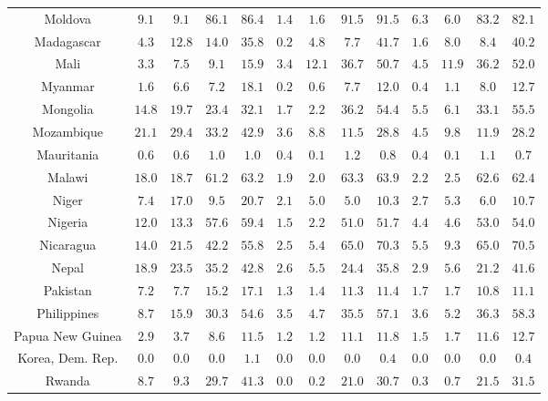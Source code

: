 \begin{longtable}{ccccccccccccc}
Moldova & $9.1$ & $9.1$ & $86.1$ & $86.4$ & $1.4$ & $1.6$ & $91.5$ & $91.5$ & $6.3$ & $6.0$ & $83.2$ & $82.1$ \\ 
Madagascar & $4.3$ & $12.8$ & $14.0$ & $35.8$ & $0.2$ & $4.8$ & $7.7$ & $41.7$ & $1.6$ & $8.0$ & $8.4$ & $40.2$ \\ 
Mali & $3.3$ & $7.5$ & $9.1$ & $15.9$ & $3.4$ & $12.1$ & $36.7$ & $50.7$ & $4.5$ & $11.9$ & $36.2$ & $52.0$ \\ 
Myanmar & $1.6$ & $6.6$ & $7.2$ & $18.1$ & $0.2$ & $0.6$ & $7.7$ & $12.0$ & $0.4$ & $1.1$ & $8.0$ & $12.7$ \\ 
Mongolia & $14.8$ & $19.7$ & $23.4$ & $32.1$ & $1.7$ & $2.2$ & $36.2$ & $54.4$ & $5.5$ & $6.1$ & $33.1$ & $55.5$ \\ 
Mozambique & $21.1$ & $29.4$ & $33.2$ & $42.9$ & $3.6$ & $8.8$ & $11.5$ & $28.8$ & $4.5$ & $9.8$ & $11.9$ & $28.2$ \\ 
Mauritania & $0.6$ & $0.6$ & $1.0$ & $1.0$ & $0.4$ & $0.1$ & $1.2$ & $0.8$ & $0.4$ & $0.1$ & $1.1$ & $0.7$ \\ 
Malawi & $18.0$ & $18.7$ & $61.2$ & $63.2$ & $1.9$ & $2.0$ & $63.3$ & $63.9$ & $2.2$ & $2.5$ & $62.6$ & $62.4$ \\ 
Niger & $7.4$ & $17.0$ & $9.5$ & $20.7$ & $2.1$ & $5.0$ & $5.0$ & $10.3$ & $2.7$ & $5.3$ & $6.0$ & $10.7$ \\ 
Nigeria & $12.0$ & $13.3$ & $57.6$ & $59.4$ & $1.5$ & $2.2$ & $51.0$ & $51.7$ & $4.4$ & $4.6$ & $53.0$ & $54.0$ \\ 
Nicaragua & $14.0$ & $21.5$ & $42.2$ & $55.8$ & $2.5$ & $5.4$ & $65.0$ & $70.3$ & $5.5$ & $9.3$ & $65.0$ & $70.5$ \\ 
Nepal & $18.9$ & $23.5$ & $35.2$ & $42.8$ & $2.6$ & $5.5$ & $24.4$ & $35.8$ & $2.9$ & $5.6$ & $21.2$ & $41.6$ \\ 
Pakistan & $7.2$ & $7.7$ & $15.2$ & $17.1$ & $1.3$ & $1.4$ & $11.3$ & $11.4$ & $1.7$ & $1.7$ & $10.8$ & $11.1$ \\ 
Philippines & $8.7$ & $15.9$ & $30.3$ & $54.6$ & $3.5$ & $4.7$ & $35.5$ & $57.1$ & $3.6$ & $5.2$ & $36.3$ & $58.3$ \\ 
Papua New Guinea & $2.9$ & $3.7$ & $8.6$ & $11.5$ & $1.2$ & $1.2$ & $11.1$ & $11.8$ & $1.5$ & $1.7$ & $11.6$ & $12.7$ \\ 
Korea, Dem. Rep. & $0.0$ & $0.0$ & $0.0$ & $1.1$ & $0.0$ & $0.0$ & $0.0$ & $0.4$ & $0.0$ & $0.0$ & $0.0$ & $0.4$ \\ 
Rwanda & $8.7$ & $9.3$ & $29.7$ & $41.3$ & $0.0$ & $0.2$ & $21.0$ & $30.7$ & $0.3$ & $0.7$ & $21.5$ & $31.5$ \\ 

\end{longtable}
